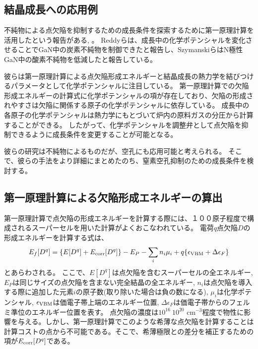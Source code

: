 \subsection{結晶成長への応用例}
不純物による点欠陥を抑制するための成長条件を探索するために第一原理計算を活用したという報告がある\cite{dft_gan_growth_carbon}, \cite{dft_gan_growth_oxygen}。
Reddyらは、成長中の化学ポテンシャルを変化させることでGaN中の炭素不純物を制御できたと報告し\cite{dft_gan_growth_carbon}、SzymanskiらはN極性GaN中の酸素不純物を低減したと報告している\cite{dft_gan_growth_oxygen}。

彼らは第一原理計算による点欠陥形成エネルギーと結晶成長の熱力学を結びつけるパラメータとして化学ポテンシャルに注目している。
第一原理計算での欠陥形成エネルギーの計算式に化学ポテンシャルの項が存在しており、欠陥の形成されやすさは欠陥に関係する原子の化学ポテンシャルに依存している。
成長中の各原子の化学ポテンシャルは熱力学にもとづいて炉内の原料ガスの分圧から計算することができる。
したがって、化学ポテンシャルを調整弁として点欠陥を抑制できるように成長条件を変更することが可能となる。

彼らの研究は不純物によるものだが、空孔にも応用可能と考えられる。
そこで、彼らの手法をより詳細にまとめたのち、窒素空孔抑制のための成長条件を検討する。

\subsection{第一原理計算による欠陥形成エネルギーの算出}
第一原理計算で点欠陥の形成エネルギーを計算する際には、１００原子程度で構成されるスーパーセルを用いた計算がよくおこなわれている。
電荷$q$点欠陥$D$の形成エネルギーを計算する式は、
\begin{equation}
  E_{f}[D^{q}] = \qty{ E[D^{q}] + E_{\rm{corr}}[D^{q}]} - E_{P} - \sum_{i}n_{i}\mu _{i} + q\qty{ \epsilon _{\rm{VBM}}+\Delta \epsilon _{F}}
\end{equation}
とあらわされる。
ここで、$E[D^{q}]$は点欠陥を含むスーパーセルの全エネルギー, $E_{P}$は同じサイズの点欠陥を含まない完全結晶の全エネルギー, $n_{i}$は点欠陥を導入する際に追加した元素$i$の原子数(取り除いた場合は負の数になる), $\mu _{i}$は化学ポテンシャル, $\epsilon _{\rm{VBM}}$は価電子帯上端のエネルギー位置, $\Delta \epsilon _{F}$は価電子帯からのフェルミ準位のエネルギー位置を表す。
点欠陥の濃度は$10^{16} ~ 10^{20}$ cm$^{-3}$程度で物性に影響を与える。しかし、第一原理計算でこのような希薄な点欠陥を計算することは計算コストの点から不可能である。そこで、希薄極限との差分を補正するための項が$ E_{\rm{corr}}[D^{q}]$である。

